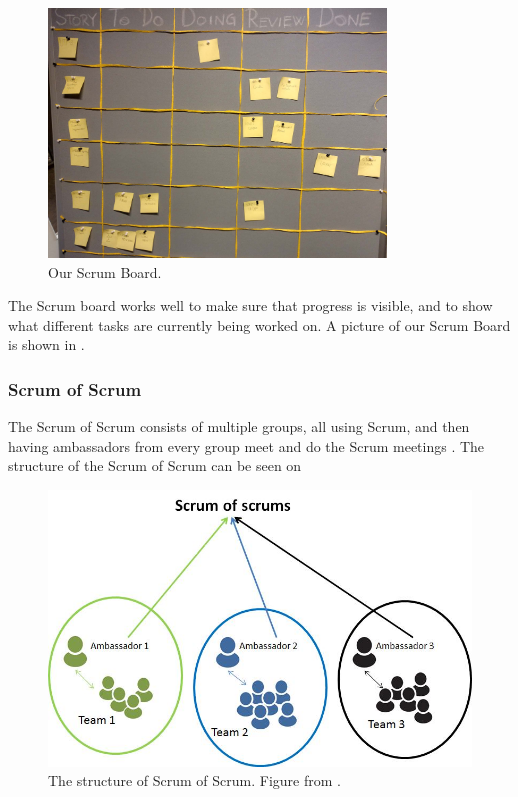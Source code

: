 \begin{description}
\begin{figure}
\begin{center}
	    \includegraphics[width=0.80\textwidth]{figures/img/scrumboard_compressed.jpg}
	  \end{center}
	  \caption{Our Scrum Board.}
	  \label{fig:scrumboard}
	\end{figure}
	The Scrum board works well to make sure that progress is visible, and to show what different tasks are currently being worked on.
	A picture of our Scrum Board is shown in .
\end{description}

\subsubsection*{Scrum of Scrum}
The Scrum of Scrum consists of multiple groups, all using Scrum, and then having ambassadors from every group meet and do the Scrum meetings \cite{ScrumBOOK}.
The structure of the Scrum of Scrum can be seen on 

\begin{figure}
\centering
\includegraphics[scale=0.4]{figures/ScrumofScrum.png}
\caption{The structure of Scrum of Scrum. Figure from \cite{ScrumofScrumfigure}.}
\label{fig:ScrumofScrum}
\end{figure}

